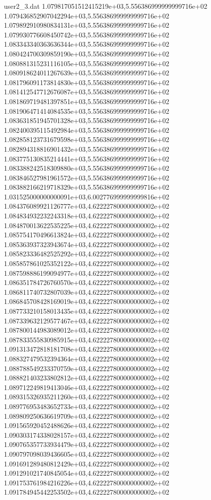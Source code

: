 \begin{filecontents}{user2_3.dat}
1.079817051512415219e+03,5.556386999999999716e+02
1.079436852907042294e+03,5.556386999999999716e+02
1.079892910980834131e+03,5.556386999999999716e+02
1.079930776608450742e+03,5.556386999999999716e+02
1.083343340363636344e+03,5.556386999999999716e+02
1.080424700309859190e+03,5.556386999999999716e+02
1.080881315231116105e+03,5.556386999999999716e+02
1.080918624011267639e+03,5.556386999999999716e+02
1.081796091173814830e+03,5.556386999999999716e+02
1.081412547712676087e+03,5.556386999999999716e+02
1.081869719481397851e+03,5.556386999999999716e+02
1.081906471414084535e+03,5.556386999999999716e+02
1.083631851945701328e+03,5.556386999999999716e+02
1.082400395115492984e+03,5.556386999999999716e+02
1.082858123731679598e+03,5.556386999999999716e+02
1.082894318816901432e+03,5.556386999999999716e+02
1.083775130835214441e+03,5.556386999999999716e+02
1.083388242518309880e+03,5.556386999999999716e+02
1.083846527981961572e+03,5.556386999999999716e+02
1.083882166219718329e+03,5.556386999999999716e+02
1.031525000000000091e+03,6.002776999999999816e+02
1.084376089921126777e+03,4.622227800000000002e+02
1.084834932232243318e+03,4.622227800000000002e+02
1.084870013622535225e+03,4.622227800000000002e+02
1.085754170496613824e+03,4.622227800000000002e+02
1.085363937323943674e+03,4.622227800000000002e+02
1.085823336482525292e+03,4.622227800000000002e+02
1.085857861025352122e+03,4.622227800000000002e+02
1.087598886199094977e+03,4.622227800000000002e+02
1.086351784726760570e+03,4.622227800000000002e+02
1.086811740732807039e+03,4.622227800000000002e+02
1.086845708428169019e+03,4.622227800000000002e+02
1.087733210158013435e+03,4.622227800000000002e+02
1.087339632129577467e+03,4.622227800000000002e+02
1.087800144983089012e+03,4.622227800000000002e+02
1.087833555830985915e+03,4.622227800000000002e+02
1.091313472818181708e+03,4.622227800000000002e+02
1.088327479532394364e+03,4.622227800000000002e+02
1.088788549233370759e+03,4.622227800000000002e+02
1.088821403233802812e+03,4.622227800000000002e+02
1.089712249819413046e+03,4.622227800000000002e+02
1.089315326935211260e+03,4.622227800000000002e+02
1.089776953483652733e+03,4.622227800000000002e+02
1.089809250636619709e+03,4.622227800000000002e+02
1.091565920452488626e+03,4.622227800000000002e+02
1.090303174338028157e+03,4.622227800000000002e+02
1.090765357733934479e+03,4.622227800000000002e+02
1.090797098039436605e+03,4.622227800000000002e+02
1.091691289480812429e+03,4.622227800000000002e+02
1.091291021740845054e+03,4.622227800000000002e+02
1.091753761984216226e+03,4.622227800000000002e+02
1.091784945442253502e+03,4.622227800000000002e+02

\end{filecontents}
